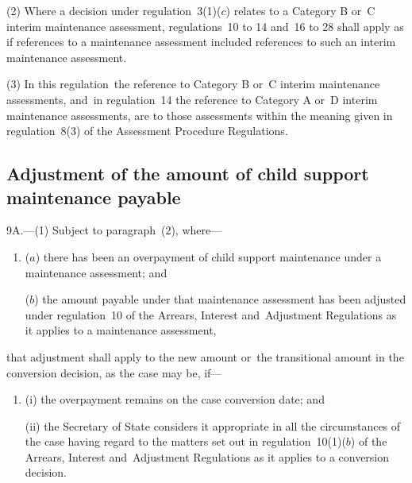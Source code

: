 \documentclass[12pt,a4paper]{article}
\begin{document}
(2) Where a decision under regulation~3(1)($c$)  relates to a Category B or~C interim maintenance assessment, 
regulations~10 to 14 and~16 to 28  %
shall apply as if references to a maintenance assessment included references to such an interim maintenance assessment.

(3) In this regulation~the reference to Category B or~C interim maintenance assessments, and~in regulation~14 the reference to Category A or~D interim maintenance assessments, are to those assessments within the meaning given in regulation~8(3) of the Assessment Procedure Regulations.



\subsection[9A. Adjustment of the amount of child support maintenance payable]{Adjustment of the amount of child support maintenance payable}

9A.---(1)  Subject to paragraph~(2), where—
\begin{enumerate}\item[]
($a$) there has been an overpayment of child support maintenance under a maintenance assessment; and

($b$) the amount payable under that maintenance assessment has been adjusted under regulation~10 of the Arrears, Interest and~Adjustment Regulations as it applies to a maintenance assessment,
\end{enumerate}
that adjustment shall apply to the new amount or~the transitional amount in the conversion decision, as the case may be, if—
\begin{enumerate}\item[]
(i) the overpayment remains on the case conversion date; and

(ii) the Secretary of State considers it appropriate in all the circumstances of the case having regard to the matters set out in regulation~10(1)($b$)  of the Arrears, Interest and~Adjustment Regulations as it applies to a conversion decision.
\end{enumerate}
\end{document}
